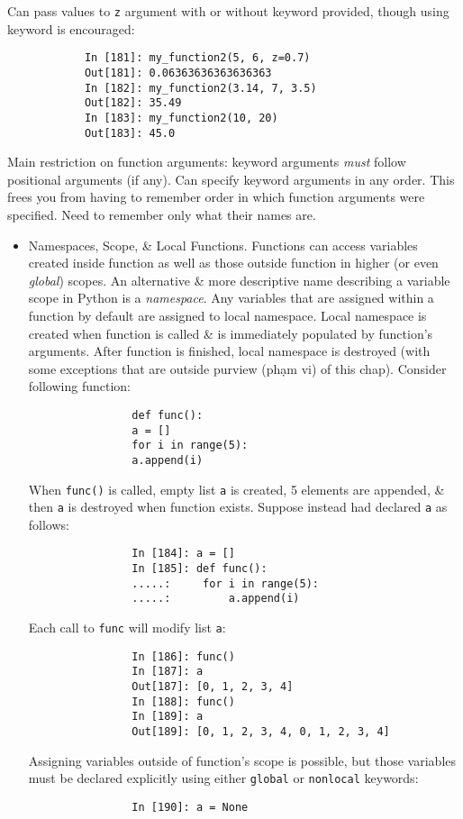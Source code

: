\documentclass{article}
\begin{document}
\begin{itemize}
\begin{itemize}
		Can pass values to {\tt z} argument with or without keyword provided, though using keyword is encouraged:
		\begin{verbatim}
			In [181]: my_function2(5, 6, z=0.7)
			Out[181]: 0.06363636363636363
			In [182]: my_function2(3.14, 7, 3.5)
			Out[182]: 35.49
			In [183]: my_function2(10, 20)
			Out[183]: 45.0
		\end{verbatim}
		Main restriction on function arguments: keyword arguments {\it must} follow positional arguments (if any). Can specify keyword arguments in any order. This frees you from having to remember order in which function arguments were specified. Need to remember only what their names are.
		\begin{itemize}
			\item {\sf Namespaces, Scope, \& Local Functions.} Functions can access variables created inside function as well as those outside function in higher (or even {\it global}) scopes. An alternative \& more descriptive name describing a variable scope in Python is a {\it namespace}. Any variables that are assigned within a function by default are assigned to local namespace. Local namespace is created when function is called \& is immediately populated by function's arguments. After function is finished, local namespace is destroyed (with some exceptions that are outside purview (phạm vi) of this chap). Consider following function:
			\begin{verbatim}
				def func():
				a = []
				for i in range(5):
				a.append(i)
			\end{verbatim}
			When {\tt func()} is called, empty list {\tt a} is created, 5 elements are appended, \& then {\tt a} is destroyed when function exists. Suppose instead had declared {\tt a} as follows:
			\begin{verbatim}
				In [184]: a = []
				In [185]: def func():
				.....:     for i in range(5):
				.....:         a.append(i)
			\end{verbatim}
			Each call to {\tt func} will modify list {\tt a}:
			\begin{verbatim}
				In [186]: func()
				In [187]: a
				Out[187]: [0, 1, 2, 3, 4]
				In [188]: func()
				In [189]: a
				Out[189]: [0, 1, 2, 3, 4, 0, 1, 2, 3, 4]
			\end{verbatim}
			Assigning variables outside of function's scope is possible, but those variables must be declared explicitly using either {\tt global} or {\tt nonlocal} keywords:
			\begin{verbatim}
				In [190]: a = None

\end{verbatim}
\end{itemize}
\end{itemize}
\end{itemize}
\end{document}
